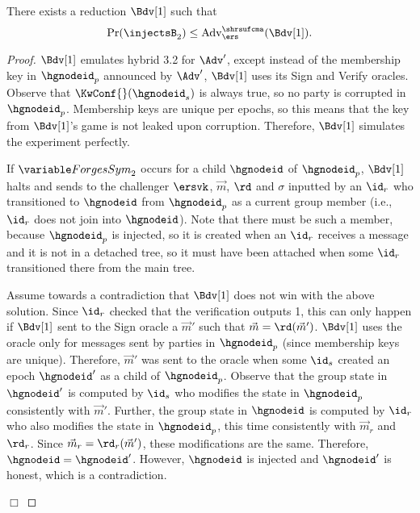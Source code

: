 \begin{claim}
  There exists a reduction $\Bdv[1]$ such that
  \begin{equation*}
    \Pr(\injectsB_2) \leq \textnormal{Adv}^{\shrsufcma}_{\ers}(\Bdv[1]).
  \end{equation*}
\end{claim}
\begin{proof}
  $\Bdv[1]$ emulates hybrid 3.2 for $\Adv'$, except instead of the membership key in $\hgnodeid_p$ announced by $\Adv'$, $\Bdv[1]$ uses its \shrsufcma Sign and Verify oracles. Observe that $\KwConf{}(\hgnodeid_s)$ is always true, so no party is corrupted in $\hgnodeid_p$. Membership keys are unique per epochs, so this means that the key from $\Bdv[1]$'s game is not leaked upon corruption. Therefore, $\Bdv[1]$ simulates the experiment perfectly.

  If $\forgess_2$ occurs for a child $\hgnodeid$ of $\hgnodeid_p$, $\Bdv[1]$ halts and sends to the challenger $\ersvk$, $\vec m$, $\rd$ and $\sigma$ inputted by an $\id_r$ who transitioned to $\hgnodeid$ from $\hgnodeid_p$ as a current group member (i.e., $\id_r$ does not join into $\hgnodeid$). Note that there must be such a member, because $\hgnodeid_p$ is injected, so it is created when an $\id_r$ receives a message and it is not in a detached tree, so it must have been attached when some $\id_r$ transitioned there from the main tree.

  Assume towards a contradiction that $\Bdv[1]$ does not win with the above solution. Since $\id_r$ checked that the \ers verification outputs 1, this can only happen if $\Bdv[1]$ sent to the Sign oracle a $\vec m'$ such that $\vec m = \rd(\vec m')$. $\Bdv[1]$ uses the oracle only for messages sent by parties in $\hgnodeid_p$ (since membership keys are unique). Therefore, $\vec m'$ was sent to the oracle when some $\id_s$ created an epoch $\hgnodeid'$ as a child of $\hgnodeid_p$.
  Observe that the group state in $\hgnodeid'$ is computed by $\id_s$ who modifies the state in $\hgnodeid_p$ consistently with $\vec m'$. Further, the group state in $\hgnodeid$ is computed by $\id_r$ who also modifies the state in $\hgnodeid_p$, this time consistently with $\vec m_r$ and $\rd_r$. Since $\vec m_r=\rd_r(\vec m')$, these modifications are the same. Therefore, $\hgnodeid=\hgnodeid'$. However, $\hgnodeid$ is injected and $\hgnodeid'$ is honest, which is a contradiction.
\strut\hfill$\Box$\end{proof}